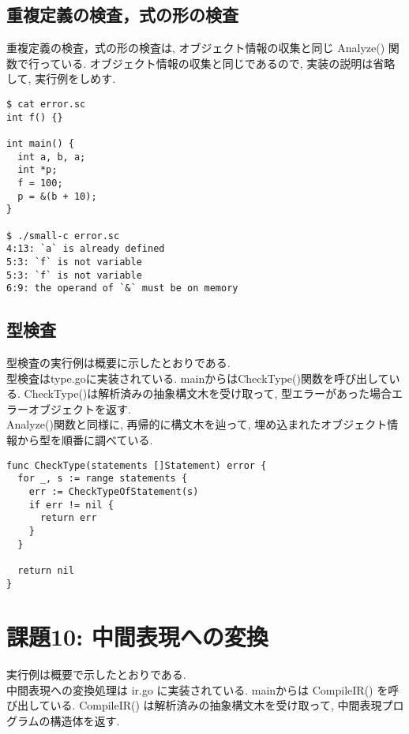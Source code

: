 \documentclass[a4j]{jarticle}
\begin{document}
\subsection{重複定義の検査，式の形の検査}
重複定義の検査，式の形の検査は, オブジェクト情報の収集と同じ Analyze() 関数で行っている. オブジェクト情報の収集と同じであるので, 実装の説明は省略して, 実行例をしめす. \\

\begin{verbatim}
$ cat error.sc
int f() {}

int main() {
  int a, b, a;
  int *p;
  f = 100;
  p = &(b + 10);
}

$ ./small-c error.sc
4:13: `a` is already defined
5:3: `f` is not variable
5:3: `f` is not variable
6:9: the operand of `&` must be on memory

\end{verbatim}

\subsection{型検査}
型検査の実行例は概要に示したとおりである. \\

型検査はtype.goに実装されている. mainからはCheckType()関数を呼び出している. CheckType()は解析済みの抽象構文木を受け取って, 型エラーがあった場合エラーオブジェクトを返す. \\

Analyze()関数と同様に, 再帰的に構文木を辿って, 埋め込まれたオブジェクト情報から型を順番に調べている. \\

\begin{verbatim}
func CheckType(statements []Statement) error {
  for _, s := range statements {
    err := CheckTypeOfStatement(s)
    if err != nil {
      return err
    }
  }

  return nil
}
\end{verbatim}

\section{課題10: 中間表現への変換}
実行例は概要で示したとおりである. \\

中間表現への変換処理は ir.go に実装されている. mainからは CompileIR() を呼び出している. CompileIR() は解析済みの抽象構文木を受け取って, 中間表現プログラムの構造体を返す. \\
\end{document}
